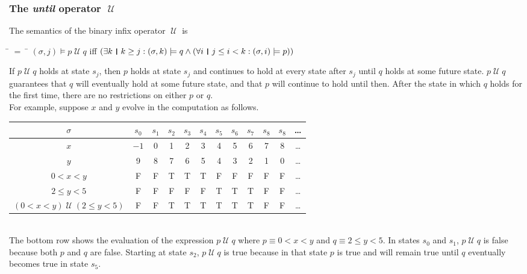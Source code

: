 \documentclass[fleqn, leqno]{article}
\newcommand{\mymathindent}{24pt}                    %
\newcommand{\Until}{\;\mathcal{U}\;}
\newcommand{\thedr}{\rule[-.25ex]{.32mm}{1.75ex}}   %
\newcommand{\dr}{\;\,\thedr\,\;}                    %
\newcommand{\rb}{:}                                 %
\newcommand{\all}{\forall}                          %
\newcommand{\ext}{\exists}                          %
\begin{document}
\subsubsection*{The \textit{until} operator $\Until$}

The semantics of the binary infix operator $\Until$ is

\begin{tabbing}
\hspace{\mymathindent} \= $= \;$ \= \kill
  \> $(\sigma, j) \models p \Until q$ \quad iff \quad $(\ext k \dr k \ge j \rb (\sigma,k) \models q \land
      (\all i \dr j\le i < k \rb (\sigma,i) \models p))$
\end{tabbing}

If $p \Until q$ holds at state $s_j$, then $p$ holds at state $s_j$ and continues to hold at every state
after $s_j$ until $q$ holds at some future state.
$p \Until q$ guarantees that $q$ will eventually hold at some future state, and that $p$ will continue to
hold until then.
After the state in which $q$ holds for the first time, there are no restrictions on either $p$ or $q$.\\

For example, suppose $x$ and $y$ evolve in the computation as follows.\\

\begin{tabular}{c|ccccccccccc}
  $\sigma$                  & $s_0$ & $s_1$ & $s_2$ & $s_3$ & $s_4$ & $s_5$ & $s_6$ & $s_7$ & $s_8$ & $s_8$ & \dots \\
  \hline
  $x$                       & $-1$  & 0     & 1     & 2     & 3     & 4     & 5     &  6    &  7    &  8    &  \dots\\
  $y$                       & 9     & 8     & 7     & 6     & 5     & 4     & 3     &  2    &  1    &  0    &  \dots\\
  $0<x<y$                   & F     & F     & T     & T     & T     & F     & F     &  F    &  F    &  F    &  \dots\\
  $2\le y<5$                & F     & F     & F     & F     & F     & T     & T     &  T    &  F    &  F    &  \dots\\
  $(0<x<y)\Until(2\le y<5)$ & F     & F     & T     & T     & T     & T     & T     &  T    &  F    &  F    &  \dots\\
\end{tabular}\\

The bottom row shows the evaluation of the expression $p\Until q$ where $p\equiv 0<x<y$ and $q\equiv 2\le y<5$.
In states $s_0$ and $s_1$, $p\Until q$ is false because both $p$ and $q$ are false.
Starting at state $s_2$, $p\Until q$ is true because in that state $p$ is true and will remain true until $q$
eventually becomes true in state $s_5$.\\
\end{document}
